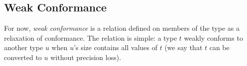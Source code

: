\subsection{Weak Conformance}
\label{sec:weak-conformance}

For now, {\em weak conformance} is a relation defined on members of the  type as a relaxation of conformance. The relation is simple: a type $t$ weakly conforms to another type $u$ when $u$'s size contains all values of $t$ (we say that $t$ can be converted to $u$ without precision loss). 

